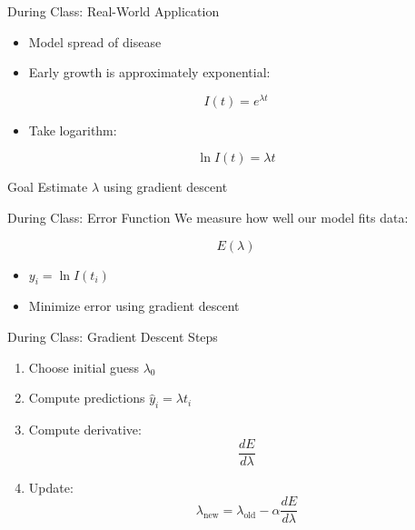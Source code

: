 \documentclass[dvipsnames]{beamer}
\begin{document}
\begin{frame}{During Class: Real-World Application}
\begin{itemize}
    \item Model spread of disease
    \item Early growth is approximately exponential:
\end{itemize}

\[
I(t) = e^{\lambda t}
\]



\begin{itemize}
    \item Take logarithm:
\end{itemize}

\[
\ln I(t) = \lambda t
\]



\begin{block}{Goal}
Estimate $\lambda$ using gradient descent
\end{block}

\end{frame}


\begin{frame}{During Class: Error Function}
We measure how well our model fits data:

\[
E(\lambda)
\]


\begin{itemize}
    \item $y_i = \ln I(t_i)$
    \item Minimize error using gradient descent
\end{itemize}

\end{frame}


\begin{frame}{During Class: Gradient Descent Steps}
\begin{enumerate}
    \item Choose initial guess $\lambda_0$
    \item Compute predictions $\hat{y}_i = \lambda t_i$
    \item Compute derivative:
    \[
    \frac{dE}{d\lambda} 
    \]
    \item Update:
    \[
    \lambda_{\text{new}} = \lambda_{\text{old}} - \alpha \frac{dE}{d\lambda}
    \]
\end{enumerate}

\end{frame}
\end{document}
